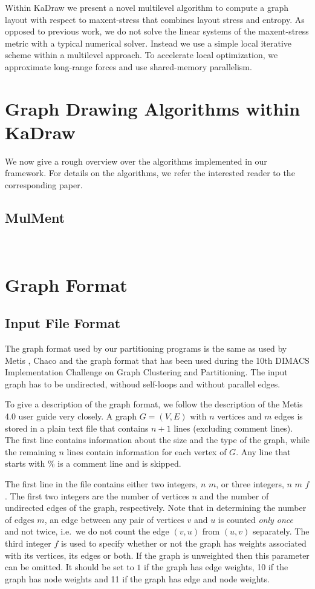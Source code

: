 \documentclass[11pt]{article}
\newcommand{\ie}{i.e.\ }
\begin{document}
Within KaDraw we present a novel multilevel algorithm to compute a graph layout with respect to maxent-stress 
that combines layout stress and entropy.
%
As opposed to previous work, we do not solve the linear systems of the maxent-stress metric with a typical 
numerical solver. Instead we use a simple local iterative scheme within a multilevel approach.
To accelerate local optimization, we approximate long-range forces and use shared-memory parallelism.
\vfill
\pagebreak

\section{Graph Drawing Algorithms within KaDraw}
We now give a rough overview over the algorithms implemented in our framework. For details on the algorithms, we refer the interested reader to the corresponding paper. 
\subsection{MulMent}
\vfill
\pagebreak
\,
\pagebreak
\section{Graph Format}
\label{ss:graphformat}
\subsection{Input File Format}
The graph format used by our partitioning programs is the same as used by Metis \cite{karypis1998fast}, Chaco \cite{chaco} and the graph format that has been used during the 10th DIMACS Implementation Challenge on Graph Clustering and Partitioning. 
The input graph has to be undirected, withoud self-loops and without parallel edges.

To give a description of the graph format, we follow the description of the Metis 4.0 user guide very closely. A graph $G=(V,E)$ with $n$ vertices and $m$ edges is stored in a plain text file that contains $n+1$ lines (excluding comment lines). The first line contains information about the size and the type of the graph, while the remaining $n$ lines contain information for each vertex of $G$. Any line that starts with \% is a comment line and is skipped.

The first line in the file contains either two integers, $n$ $m$, or three integers, $n$ $m$ $f$. The first two integers are the number of vertices $n$ and the number of undirected edges of the graph, respectively. Note that in determining the number of edges $m$, an edge between any pair of vertices $v$ and $u$ is counted \emph{only once} and not twice, \ie we do not count the edge $(v,u)$ from $(u,v)$ separately. The third integer $f$ is used to specify whether or not the graph has weights associated with its vertices, its edges or both. If the graph is unweighted then this parameter can be omitted. It should be set to $1$ if the graph has edge weights, 10 if the graph has node weights and 11 if the graph has edge and node weights.
\end{document}
